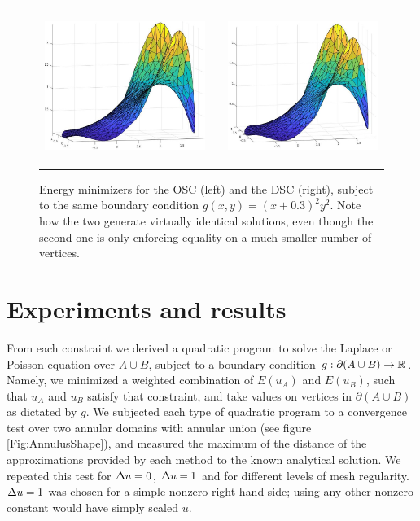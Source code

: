 \documentclass[11pt,a4paper, final, twoside]{article}
\theoremstyle{proposition}
\theoremstyle{definition}
\theoremstyle{remark}
\numberwithin{equation}{section}
\begin{document}
\begin{figure}[h]\centering
\begin{tabular}{ccc}\\
\includegraphics[height=5cm]{Overlap_sampling_constraint} & \quad &
\includegraphics[height=5cm]{Dirichlet_Sampling_Constraint}
\end{tabular}
\caption{Energy minimizers for the OSC (left) and the DSC (right), subject to the same boundary condition $g(x,y) = (x+0.3)^2y^2$. Note how the two generate virtually identical solutions, even though the second one is only enforcing equality on a much smaller number of vertices.
}
\label{Fig:VisualizingConstraints}
\end{figure}

\newpage
\section{Experiments and results}\label{I2}

From each constraint we derived a quadratic program to solve the Laplace or Poisson equation over $A \cup B$, subject to a boundary condition $g : \partial(A \cup B) \to \mathbb{R}$. Namely, we minimized a weighted combination of $E(u_A)$ and $E(u_B)$, such that $u_A$ and $u_B$ satisfy that constraint, and take values on vertices in $\partial(A \cup B)$ as dictated by $g$. We subjected each type of quadratic program to a  convergence test over two annular domains with annular union (see figure \ref{Fig:AnnulusShape}), and measured the maximum of the distance of the approximations provided by each method to the known analytical solution. We repeated this test for $\Delta u=0$, $\Delta u=1$ and for different levels of mesh regularity. $\Delta u = 1$ was chosen for a simple nonzero right-hand side; using any other nonzero constant would have simply scaled $u$.
\end{document}
